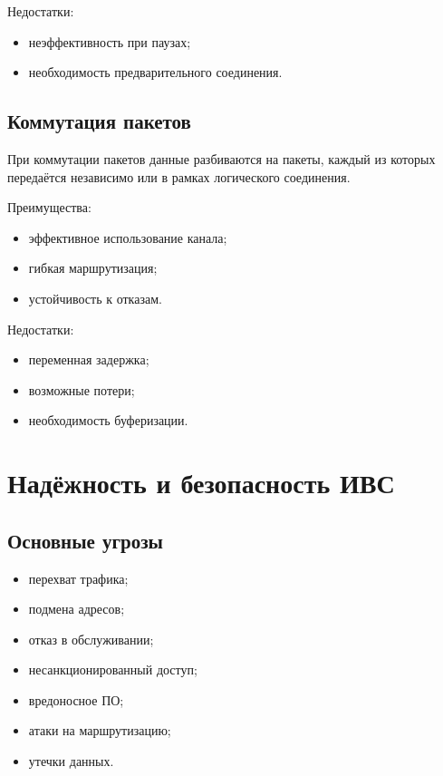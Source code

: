 \documentclass[12pt,a4paper]{article}
\begin{document}
Недостатки:
\begin{itemize}
    \item неэффективность при паузах;
    \item необходимость предварительного соединения.
\end{itemize}

\subsection{Коммутация пакетов}

При коммутации пакетов данные разбиваются на пакеты, каждый из которых передаётся независимо или в рамках логического соединения.

Преимущества:
\begin{itemize}
    \item эффективное использование канала;
    \item гибкая маршрутизация;
    \item устойчивость к отказам.
\end{itemize}

Недостатки:
\begin{itemize}
    \item переменная задержка;
    \item возможные потери;
    \item необходимость буферизации.
\end{itemize}

\section{Надёжность и безопасность ИВС}

\subsection{Основные угрозы}

\begin{itemize}
    \item перехват трафика;
    \item подмена адресов;
    \item отказ в обслуживании;
    \item несанкционированный доступ;
    \item вредоносное ПО;
    \item атаки на маршрутизацию;
    \item утечки данных.
\end{itemize}
\end{document}
